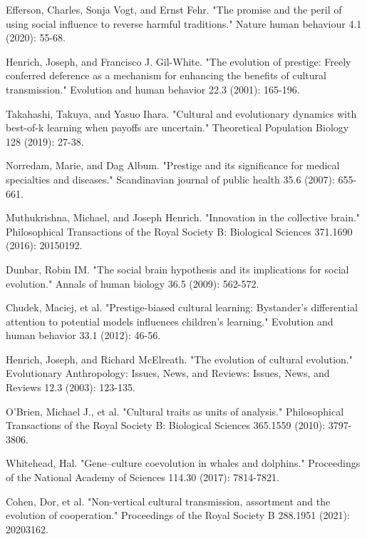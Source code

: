 \documentclass[12pt]{extarticle}
\begin{document}
\begin{thebibliography}{}
Efferson, Charles, Sonja Vogt, and Ernst Fehr. "The promise and the peril of using social influence to reverse harmful traditions." Nature human behaviour 4.1 (2020): 55-68.

Henrich, Joseph, and Francisco J. Gil-White. "The evolution of prestige: Freely conferred deference as a mechanism for enhancing the benefits of cultural transmission." Evolution and human behavior 22.3 (2001): 165-196.

Takahashi, Takuya, and Yasuo Ihara. "Cultural and evolutionary dynamics with best-of-k learning when payoffs are uncertain." Theoretical Population Biology 128 (2019): 27-38.

Norredam, Marie, and Dag Album. "Prestige and its significance for medical specialties and diseases." Scandinavian journal of public health 35.6 (2007): 655-661.

Muthukrishna, Michael, and Joseph Henrich. "Innovation in the collective brain." Philosophical Transactions of the Royal Society B: Biological Sciences 371.1690 (2016): 20150192.

Dunbar, Robin IM. "The social brain hypothesis and its implications for social evolution." Annals of human biology 36.5 (2009): 562-572.

Chudek, Maciej, et al. "Prestige-biased cultural learning: Bystander's differential attention to potential models influences children's learning." Evolution and human behavior 33.1 (2012): 46-56.

Henrich, Joseph, and Richard McElreath. "The evolution of cultural evolution." Evolutionary Anthropology: Issues, News, and Reviews: Issues, News, and Reviews 12.3 (2003): 123-135.

O'Brien, Michael J., et al. "Cultural traits as units of analysis." Philosophical Transactions of the Royal Society B: Biological Sciences 365.1559 (2010): 3797-3806.

Whitehead, Hal. "Gene–culture coevolution in whales and dolphins." Proceedings of the National Academy of Sciences 114.30 (2017): 7814-7821.

Cohen, Dor, et al. "Non-vertical cultural transmission, assortment and the evolution of cooperation." Proceedings of the Royal Society B 288.1951 (2021): 20203162.


\end{thebibliography}
\end{document}
